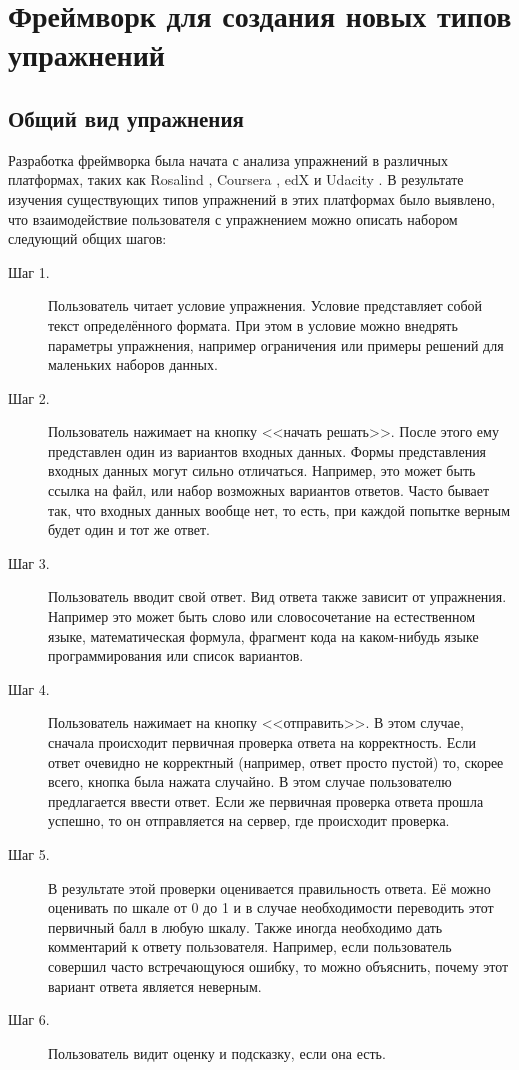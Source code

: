 \documentclass{matmex-diploma-custom}
\begin{document}
\section{Фреймворк для создания новых типов упражнений}

\subsection{Общий вид упражнения}
Разработка фреймворка была начата с анализа упражнений в различных
платформах, таких как Rosalind \cite{rosalind}, Coursera
\cite{coursera}, edX \cite{edx} и Udacity \cite{udacity}. В результате
изучения существующих типов упражнений в этих платформах было
выявлено, что взаимодействие пользователя с упражнением можно описать
набором следующий общих шагов:

\begin{description}
\item[Шаг 1.] Пользователь читает условие упражнения. Условие
  представляет собой текст определённого формата. При этом в условие
  можно внедрять параметры упражнения, например ограничения или
  примеры решений для маленьких наборов данных.

\item[Шаг 2.] Пользователь нажимает на кнопку <<начать решать>>.
  После этого ему представлен один из вариантов входных данных. Формы
  представления входных данных могут сильно отличаться. Например, это
  может быть ссылка на файл, или набор возможных вариантов
  ответов. Часто бывает так, что входных данных вообще нет, то есть,
  при каждой попытке верным будет один и тот же ответ.

\item[Шаг 3.] Пользователь вводит свой ответ. Вид ответа также зависит
  от упражнения. Например это может быть слово или словосочетание на
  естественном языке, математическая формула, фрагмент кода на
  каком-нибудь языке программирования или список вариантов.

\item[Шаг 4.] Пользователь нажимает на кнопку <<отправить>>. В этом
  случае, сначала происходит первичная проверка ответа на
  корректность. Если ответ очевидно не корректный (например, ответ
  просто пустой) то, скорее всего, кнопка была нажата случайно. В этом
  случае пользователю предлагается ввести ответ. Если же первичная
  проверка ответа прошла успешно, то он отправляется на сервер, где
  происходит проверка.

\item[Шаг 5.] В результате этой проверки оценивается правильность
  ответа. Её можно оценивать по шкале от 0 до 1 и в случае
  необходимости переводить этот первичный балл в любую шкалу. Также
  иногда необходимо дать комментарий к ответу пользователя. Например,
  если пользователь совершил часто встречающуюся ошибку, то можно
  объяснить, почему этот вариант ответа является неверным.

\item[Шаг 6.] Пользователь видит оценку и подсказку, если она есть.
\end{description}
\end{document}
